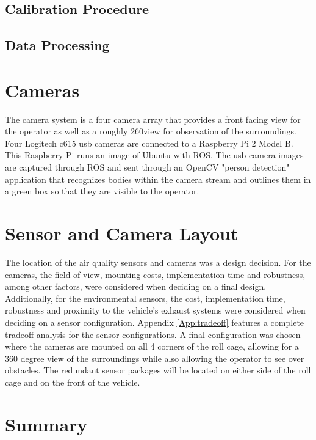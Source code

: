 \subsection{Calibration Procedure}

\subsection{Data Processing}

\section{Cameras}

The camera system is a four camera array that provides a front facing view for the operator as well as a roughly 260\degree  view for observation of the surroundings. Four Logitech c615 usb cameras are connected to a Raspberry Pi 2 Model B. This Raspberry Pi runs an image of Ubuntu with ROS. The usb camera images are captured through ROS and sent through an OpenCV "person detection" application that recognizes bodies within the camera stream and outlines them in a green box so that they are visible to the operator. 

\section{Sensor and Camera Layout}

The location of the air quality sensors and cameras was a design decision. For the cameras, the field of view, mounting costs, implementation time and robustness, among other factors, were considered when deciding on a final design. Additionally, for the environmental sensors, the cost, implementation time, robustness and proximity to the vehicle's exhaust systems were considered when deciding on a sensor configuration. Appendix \ref{App:tradeoff} features a complete tradeoff analysis for the sensor configurations. A final configuration was chosen where the cameras are mounted on all 4 corners of the roll cage, allowing for a 360 degree view of the surroundings while also allowing the operator to see over obstacles. The redundant sensor packages will be located on either side of the roll cage and on the front of the vehicle. 

\section{Summary}